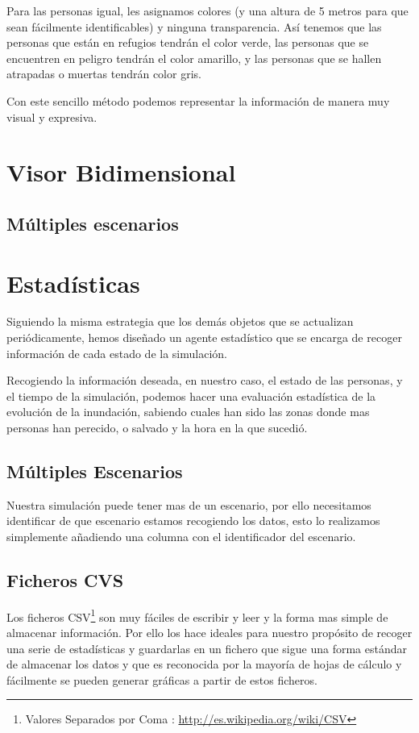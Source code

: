 Para las personas igual, les asignamos colores (y una altura de 5 metros para
que sean fácilmente identificables) y ninguna transparencia.
Así tenemos que las personas que están en refugios tendrán el color verde, las
personas que se encuentren en peligro tendrán el color amarillo, y las personas
que se hallen atrapadas o muertas tendrán color gris.

Con este sencillo método podemos representar la información de manera muy
visual y expresiva.
\section*{Visor Bidimensional}
\subsection*{Múltiples escenarios}
\section*{Estadísticas}
Siguiendo la misma estrategia que los demás objetos que se actualizan
periódicamente, hemos diseñado un agente estadístico que se encarga de recoger
información de cada estado de la simulación.

Recogiendo la información deseada, en nuestro caso, el estado de las personas,
y el tiempo de la simulación, podemos hacer una evaluación estadística de la
evolución de la inundación, sabiendo cuales han sido las zonas donde mas
personas han perecido, o salvado y la hora en la que sucedió.
\subsection*{Múltiples Escenarios}
Nuestra simulación puede tener mas de un escenario, por ello necesitamos
identificar de que escenario estamos recogiendo los datos, esto lo realizamos
simplemente añadiendo una columna con el identificador del escenario.
\subsection*{Ficheros CVS}
Los ficheros CSV\footnote{Valores Separados por Coma :
\url{http://es.wikipedia.org/wiki/CSV}} son muy fáciles de escribir y leer y la
forma mas simple de almacenar información. Por ello los hace ideales para
nuestro propósito de recoger una serie de estadísticas y guardarlas en un
fichero que sigue una forma estándar de almacenar los datos y que es reconocida
por la mayoría de hojas de cálculo y fácilmente se pueden generar gráficas a 
partir de estos ficheros.
